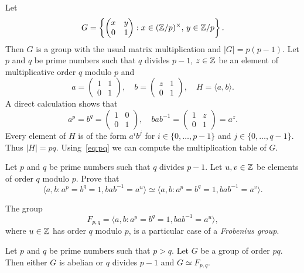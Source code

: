 Let 
\[
G=\left\{\begin{pmatrix}
x & y\\
0 & 1
\end{pmatrix}
:x\in(\mathbb{Z}/p)^\times,\,y\in\mathbb{Z}/p\right\}.
\]
Then $G$ is a group with the usual matrix multiplication
and $|G|=p(p-1)$. 
Let $p$ and $q$ be prime numbers such that $q$ divides $p-1$, 
$z\in\mathbb{Z}$ be an element of multiplicative order $q$ modulo $p$ 
and 
\[
a=\begin{pmatrix}
1&1\\
0&1
\end{pmatrix},
\quad
b=\begin{pmatrix}
z&1\\
0&1
\end{pmatrix},
\quad
H=\langle a,b\rangle.
\]
A direct calculation shows that 
\begin{equation}
\label{eq:pq}
a^p=b^q=\begin{pmatrix}
1&0\\
0&1
\end{pmatrix},
\quad
bab^{-1}=\begin{pmatrix}
1&z\\
0&1
\end{pmatrix}
=a^z.
\end{equation}
Every element of $H$ is of the form $a^ib^j$ for $i\in\{0,\dots,p-1\}$ and  $j\in\{0,\dots,q-1\}$. 
Thus $|H|=pq$. Using~\eqref{eq:pq} we can compute 
the multiplication table of $G$. 

\begin{exercise}
    Let $p$ and $q$ be prime numbers such that $q$ divides $p-1$. Let
    $u,v\in\mathbb{Z}$ be elements of order $q$ modulo $p$. 
    Prove that 
    \[
    \langle a,b:a^p=b^q=1,bab^{-1}=a^u\rangle
    \simeq \langle a,b:a^p=b^q=1,bab^{-1}=a^v\rangle.
    \]
\end{exercise}

The group   
\[
F_{p,q}=\langle a,b:a^p=b^q=1,bab^{-1}=a^u\rangle,
\]
where $u\in\mathbb{Z}$ has order $q$ modulo $p$, 
is a particular case of a  
\emph{Frobenius group}. 

\begin{proposition}
    Let $p$ and $q$ be prime numbers such that $p>q$. Let  
    $G$ be a group of order $pq$. Then either $G$ is abelian or
    $q$ divides $p-1$ and 
    $G\simeq F_{p,q}$.
\end{proposition}

